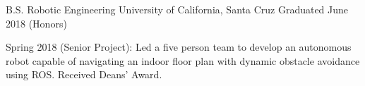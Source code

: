 \begin{cventries}
  \cventry
  {B.S. Robotic Engineering}
  {University of California, Santa Cruz}
  {Graduated June 2018 (Honors)}
  {}
  {
    \begin{cvitems}
      \item Spring 2018 (Senior Project): Led a five person team to develop an autonomous robot capable of
      navigating an indoor floor plan with dynamic obstacle avoidance using ROS. Received Deans' Award.
    \end{cvitems}
  }
\end{cventries}
